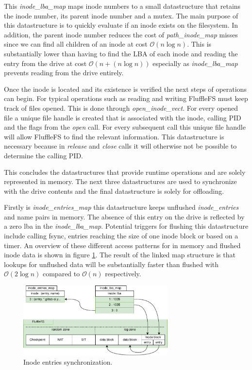 This \textit{inode\_lba\_map} maps inode numbers to a small datastructure that
retains the inode number, its parent inode number and a mutex. The main purpose
of this datastructure is to quickly evaluate if an inode exists on the
filesystem. In addition, the parent inode number reduces the cost of
\textit{path\_inode\_map} misses since we can find all children of an inode at
cost $\mathcal{O}(n \log n)$. This is substantially lower than having to find
the LBA of each inode and reading the entry from the drive at cost
$\mathcal{O}(n + (n \log n))$ especially as \textit{inode\_lba\_map} prevents
reading from the drive entirely.

Once the inode is located and its existence is verified the next steps of
operations can begin. For typical operations such as reading and writing
FluffleFS must keep track of files opened. This is done through
\textit{open\_inode\_vect}. For every opened file a unique file handle is
created that is associated with the inode, calling PID and the flags from the
\textit{open} call. For every subsequent call this unique file handle will allow
FluffleFS to find the relevant information. This datastructure is necessary
because in \textit{release} and \textit{close} calls it will otherwise not be
possible to determine the calling PID.

This concludes the datastructures that provide runtime operations and are solely
represented in memory. The next three datastructures are used to synchronize
with the drive contents and the final datastructure is solely for offloading.

Firstly is \textit{inode\_entries\_map} this datastructure keeps unflushed
\textit{inode\_entries} and name pairs in memory. The absence of this entry on
the drive is reflected by a zero lba in the \textit{inode\_lba\_map}. Potential
triggers for flushing this datastructure include calling fsync, entries reaching
the size of one inode block or based on a timer. An overview of these different
access patterns for in memory and flushed inode data is shown in figure
\ref{figure:fluffleinodesync}. The result of the linked map structure is that
lookups for unflushed data will be substantially faster than flushed
with $\mathcal{O}(2 \log n)$ compared to $\mathcal{O}(n)$ respectively.

\begin{figure}[h!]
    \centering
	\includegraphics[width=0.7\textwidth]{resources/images/fluffle-inode-sync.pdf}
	\caption{Inode entries synchronization.}
    \label{figure:fluffleinodesync}
\end{figure}

